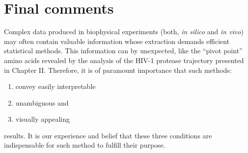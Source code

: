 \section{Final comments}

Complex data produced in biophysical experiments (both, \emph{in silico} and \emph{in vivo}) may often contain valuable information whose extraction demands efficient statistical methods.
This information can by unexpected, like the ``pivot point'' amino acids revealed by the analysis of the HIV-1 protease trajectory presented in Chapter II.
Therefore, it is of paramount importance that such methods:
\begin{enumerate}
 \item convey easily interpretable
 \item unambiguous and
 \item visually appealing
\end{enumerate}
results.
It is our experience and belief that these three conditions are indispensable for such method to fulfill their purpose.

